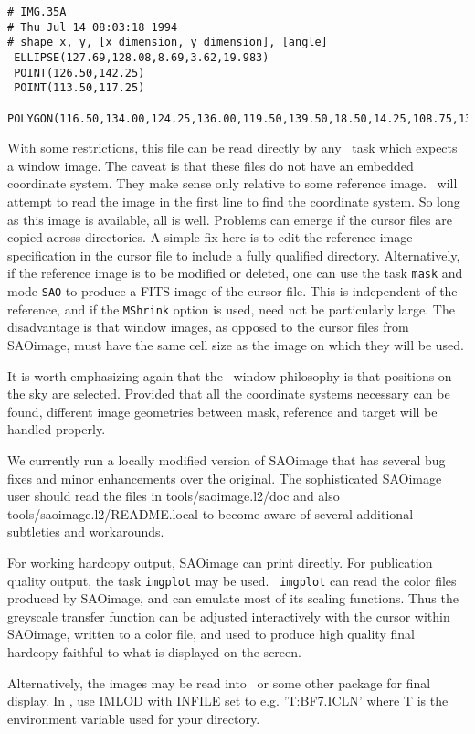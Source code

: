 \begin{verbatim}
# IMG.35A
# Thu Jul 14 08:03:18 1994
# shape x, y, [x dimension, y dimension], [angle]
 ELLIPSE(127.69,128.08,8.69,3.62,19.983)
 POINT(126.50,142.25)
 POINT(113.50,117.25)
 POLYGON(116.50,134.00,124.25,136.00,119.50,139.50,18.50,14.25,108.75,139.50)
\end{verbatim}

With some restrictions, this file can be read directly by any \sde\
task which expects a window image.  The caveat is that these files do
not have an embedded coordinate system.  They make sense only relative
to some reference image.  \sde\ will attempt to read the image in the
first line to find the coordinate system.  So long as this image is
available, all is well.  Problems can emerge if the cursor files are
copied across directories.  A simple fix here is to edit the reference
image specification in the cursor file to include a fully qualified
directory.  Alternatively, if the reference image is to be modified or
deleted, one can use the task {\tt mask} and mode {\tt SAO} to produce
a FITS image of the cursor file.  This is independent of the
reference, and if the {\tt MShrink} option is used, need not be
particularly large.  The disadvantage is that window images, as
opposed to the cursor files from SAOimage, must have the same cell
size as the image on which they will be used.

It is worth emphasizing again that the \sde\ window philosophy is that
positions on the sky are selected.  Provided that all the coordinate systems
necessary can be found, different image geometries between mask, reference
and target will be handled properly.

We currently run a locally modified version of SAOimage that has
several bug fixes and minor enhancements over the original.  The
sophisticated SAOimage user should read the files in
tools/saoimage.l2/doc and also tools/saoimage.l2/README.local to
become aware of several additional subtleties and workarounds.

For working hardcopy output, SAOimage can print directly.  For
publication quality output, the task {\tt imgplot} may be used.  {\tt
imgplot} can read the color files produced by SAOimage, and can
emulate most of its scaling functions.  Thus the greyscale transfer
function can be adjusted interactively with the cursor within
SAOimage, written to a color file, and used to produce high quality
final hardcopy faithful to what is displayed on the screen.

Alternatively, the images may be read into \aips\ or some other package
for final display.  In \aips, use IMLOD with INFILE set to
e.g. 'T:BF7.ICLN' where T is the environment variable used for your
directory.

